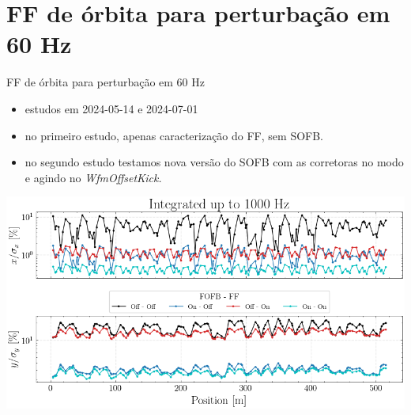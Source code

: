 \section{FF de órbita para perturbação em 60 Hz}


\begin{frame}{FF de órbita para perturbação em 60 Hz}

{\footnotesize
\begin{itemize}
    \setlength\itemsep{0.5em}
    \item estudos em 2024-05-14 e 2024-07-01 \href{https://ais-eng-srv-ta.cnpem.br/Olog/index.html\#22801\_4}{}
    \item no primeiro estudo, apenas caracterização do FF, sem SOFB.
    \item no segundo estudo testamos nova versão do SOFB com as corretoras no modo  e agindo no \it{WfmOffsetKick}.
\end{itemize}
}
\vspace{-0.2cm}
\centering
\includegraphics[width=0.7\linewidth]{2024-07-12/figures/integrated_distortion_up_to_1000Hz_run2.png}
\end{frame}
